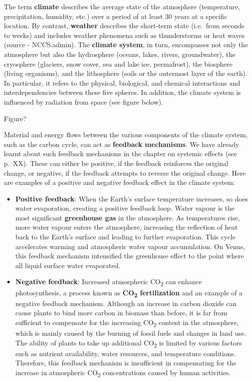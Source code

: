 \documentclass[
  a4paper,
  openany]{book}
\begin{document}
The term \textbf{climate} describes the average state of the atmosphere
(temperature, precipitation, humidity, etc.) over a period of at least
30 years at a specific location. By contrast, \textbf{weather} describes
the short-term state (i.e.~from seconds to weeks) and includes weather
phenomena such as thunderstorms or heat waves (source - NCCS.admin). The
\textbf{climate system}, in turn, encompasses not only the atmosphere
but also the hydrosphere (oceans, lakes, rivers, groundwater), the
cryosphere (glaciers, snow cover, sea and lake ice, permafrost), the
biosphere (living organisms), and the lithosphere (soils or the
outermost layer of the earth). In particular, it refers to the physical,
biological, and chemical interactions and interdependencies between
these five spheres. In addition, the climate system is influenced by
radiation from space (see figure below).

Figure?

Material and energy flows between the various components of the climate
system, such as the carbon cycle, can act as \textbf{feedback
mechanisms}. We have already learnt about such feedback mechanisms in
the chapter on systemic effects (see p.~XX). These can either be
positive, if the feedback reinforces the original change, or negative,
if the feedback attempts to reverse the original change. Here are
examples of a positive and negative feedback effect in the climate
system:

\begin{itemize}
\item
  \textbf{Positive feedback}: When the Earth's surface temperature
  increases, so does water evaporation, creating a positive feedback
  loop. Water vapour is the most significant \textbf{greenhouse gas} in
  the atmosphere. As temperatures rise, more water vapour enters the
  atmosphere, increasing the reflection of heat back to the Earth's
  surface and leading to further evaporation. This cycle accelerates
  warming and atmospheric water vapour accumulation. On Venus, this
  feedback mechanism intensified the greenhouse effect to the point
  where all liquid surface water evaporated.
\item
  \textbf{Negative feedback}: Increased atmospheric CO\textsubscript{2}
  can enhance photosynthesis, a process known as
  \textbf{CO\textsubscript{2} fertilization} and an example of a
  negative feedback mechanism. Although an increase in carbon dioxide
  can cause plants to bind more carbon in biomass than before, it is far
  from sufficient to compensate for the increasing CO\textsubscript{2}
  content in the atmosphere, which is mainly caused by the burning of
  fossil fuels and changes in land use. The ability of plants to take up
  additional CO\textsubscript{2} is limited by various factors such as
  nutrient availability, water resources, and temperature conditions.
  Therefore, this feedback mechanism is insufficient in compensating for
  the increase in atmospheric CO\textsubscript{2} concentrations caused
  by human activities.
\end{itemize}
\end{document}

